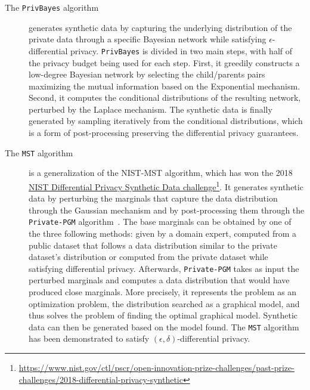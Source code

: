 \documentclass{article}
\newcommand{\myhref}[2]{\href{#1}{#2}\footnote{\url{#1}}}
\begin{document}
\begin{description}
\item[The \texttt{PrivBayes} algorithm~\cite{privbayes}] generates
  synthetic data by capturing the underlying distribution of the
  private data through a specific Bayesian network while satisfying $\epsilon$-differential privacy.
  \texttt{PrivBayes} is divided in two main steps, with half of the privacy budget being used for each step.
  First, it greedily constructs a low-degree Bayesian network by selecting the
  child/parents pairs maximizing the mutual information based on the
  Exponential mechanism\cite{Dwork2014TheAF}.
  Second, it computes the conditional distributions of the resulting
  network, perturbed by the Laplace mechanism.
  The synthetic data is finally generated by sampling iteratively from the conditional
  distributions, which is a form of post-processing preserving the differential privacy guarantees.

\item[The \texttt{MST} algorithm~\cite{mckenna_winning_2021}] is a
  generalization of the NIST-MST algorithm, which has won the 2018
  \myhref{https://www.nist.gov/ctl/pscr/open-innovation-prize-challenges/past-prize-challenges/2018-differential-privacy-synthetic}{NIST Differential Privacy Synthetic Data challenge}.
  It generates synthetic data by perturbing the marginals that capture the data distribution through the Gaussian mechanism and by
  post-processing them through the \texttt{Private-PGM}
  algorithm~\cite{privatepgm19}.
  The base marginals can be obtained by one of the three following methods: given by a domain
  expert, computed from a public dataset that follows a data
  distribution similar to the private dataset's distribution or
  computed from the private dataset while satisfying differential
  privacy.
  Afterwards, \texttt{Private-PGM} takes as input the
  perturbed marginals and computes a data distribution that would have
  produced close marginals.
  More precisely, it represents the problem
  as an optimization problem, the distribution searched as a graphical
  model, and thus solves the problem of finding the optimal graphical
  model.
  Synthetic data can then be generated based on the model
  found.
  The \texttt{MST} algorithm has been demonstrated to satisfy
  $(\epsilon, \delta)$-differential privacy.


\end{description}
\end{document}
